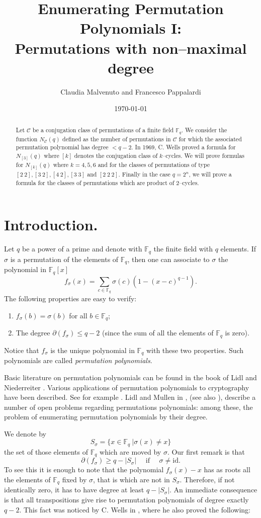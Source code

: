 \documentclass[10pt,a4paper,twoside]{article}
\title{Enumerating Permutation Polynomials I:\\  Permutations with non--maximal degree}
\author{Claudia Malvenuto and Francesco Pappalardi}
\date{\today}
\def\Fq{{\mathbb{F}}_q}
\def\Cl{{\mathcal{C}}}
\begin{document}
\maketitle
\begin{abstract}
Let $\Cl$ be a conjugation class of permutations of a finite field
$\Fq$. We
consider the function $N_{\Cl}(q)$ defined as the number of permutations in
$\Cl$ for which the associated permutation polynomial has degree $<q-2$. In 1969,
C. Wells proved a formula for $N_{[3]}(q)$ where $[k]$ denotes the conjugation class of
$k$--cycles. We will prove formulas for $N_{[k]}(q)$ where $k=4, 5, 6$ and for the
classes of permutations of type $[2\ 2], [3\ 2], [4\ 2], [3\ 3]$ and $[2\ 2\ 2]$.
Finally
in the case $q=2^n$, we will prove a formula for the classes of permutations
which are product
of $2$--cycles.
\end{abstract}
\section{Introduction.}
Let $q$ be a power of a prime and denote with $\Fq$ the finite field with $q$
elements. If $\sigma$ is a permutation of the elements of $\Fq$, then one can
associate to $\sigma$ the polynomial in $\Fq[x]$
\begin{equation}\label{definiz}
f_\sigma(x)=\sum_{c\in\Fq}\sigma(c)\left(1-\left(x-c\right)^{q-1}\right).
\end{equation}
The following properties are easy to verify:
\begin{enumerate}
\item $f_\sigma(b)=\sigma(b)$ for all $b\in\Fq$;
\item The degree $\partial(f_\sigma)\leq q-2$ (since the sum of all the
elements of $\Fq$ is zero).
\end{enumerate}
Notice that $f_\sigma$ is the unique polynomial in $\Fq$ with these
two properties. Such
polynomials are called \emph{permutation polynomials}.

Basic literature on permutation polynomials can be found in the book
of Lidl and Niederreiter \cite{LN}. Various applications of permutation polynomials to
cryptography have been described. See for example \cite{LB,LMu}.
Lidl and Mullen in \cite{LM1,LM2}, (see also \cite{M}),
describe a number of open problems regarding permutations polynomials: among these,
the problem of enumerating permutation polynomials by their degree.

We denote by
$$S_\sigma = \{x\in \Fq\ | \sigma(x)\neq x\}$$
the set of those elements of $\Fq$ which are moved by $\sigma$.
Our first remark is that
\begin{equation}\label{lb}
\partial(f_\sigma)\geq q-|S_\sigma| \quad \textrm{ if }\quad  \sigma\neq\textrm{id}.
\end{equation}
To see this it is enough to note that the polynomial $f_\sigma(x)-x$ has as roots all
the elements of $\Fq$ fixed by $\sigma$, that is which are not in $S_\sigma$.
Therefore, if not identically zero, it has to have degree at least $q-|S_\sigma|$.
An immediate consequence is that all transpositions give rise to permutation polynomials
of degree exactly $q-2$. This fact was noticed by C. Wells in \cite{W},
where he also proved the following:
\end{document}
